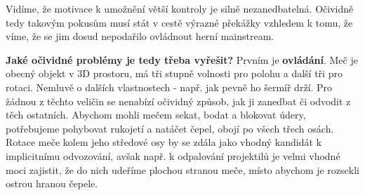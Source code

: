 Vidíme, že motivace k umožnění větší kontroly je silně nezanedbatelná. Očividně tedy takovým pokusům musí stát v cestě výrazné překážky vzhledem k tomu, že víme, že se jim dosud nepodařilo ovládnout herní mainstream.

\textbf{Jaké očividné problémy je tedy třeba vyřešit?}
\bigbreak
Prvním je \textbf{ovládání}. Meč je obecný objekt v 3D prostoru, má tři stupně volnosti pro polohu a další tři pro rotaci. Nemluvě o dalších vlastnostech - např. jak pevně ho šermíř drží. Pro žádnou z těchto veličin se nenabízí očividný způsob, jak ji zanedbat či odvodit z těch ostatních. Abychom mohli mečem sekat, bodat a blokovat údery, potřebujeme pohybovat rukojetí a natáčet čepel, obojí po všech třech osách. Rotace meče kolem jeho středové osy by se zdála jako vhodný kandidát k implicitnímu odvozování, avšak např. k odpalování projektilů je velmi vhodné moci zajistit, že do nich udeříme plochou stranou meče, místo abychom je rozsekli ostrou hranou čepele.

